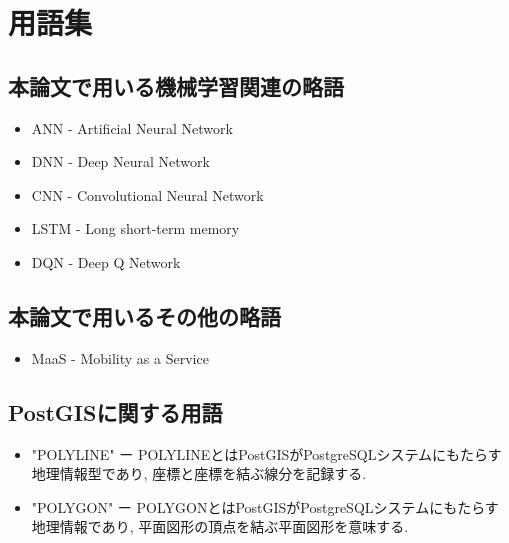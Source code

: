 \chapter{用語集}


\section{本論文で用いる機械学習関連の略語}

\begin{itemize}
    \item ANN   - Artificial Neural Network
    \item DNN   - Deep Neural Network
    \item CNN   - Convolutional Neural Network
    \item LSTM  - Long short-term memory
    \item DQN   - Deep Q Network
\end{itemize}


\section{本論文で用いるその他の略語}

\begin{itemize}
    \item MaaS - Mobility as a Service
\end{itemize}


\section{PostGISに関する用語}


\begin{itemize}
    \item "POLYLINE" ー POLYLINEとはPostGISがPostgreSQLシステムにもたらす地理情報型であり, 座標と座標を結ぶ線分を記録する.
    \item "POLYGON"  ー POLYGONとはPostGISがPostgreSQLシステムにもたらす地理情報であり, 平面図形の頂点を結ぶ平面図形を意味する.
\end{itemize}